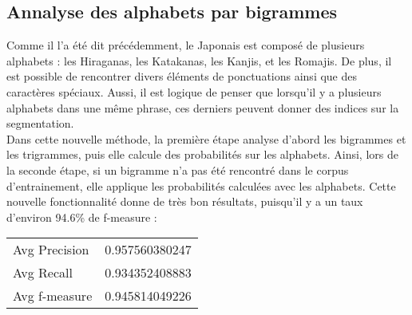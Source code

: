 
\subsection{Annalyse des alphabets par bigrammes}

Comme il l'a été dit précédemment, le Japonais est composé de plusieurs alphabets : les Hiraganas, les Katakanas, les Kanjis, et les Romajis. De plus, il est possible de rencontrer divers éléments de ponctuations ainsi que des caractères spéciaux. Aussi, il est logique de penser que lorsqu'il y a plusieurs alphabets dans une même phrase, ces derniers peuvent donner des indices sur la segmentation. \\

Dans cette nouvelle méthode, la première étape analyse d'abord les bigrammes et les trigrammes, puis elle calcule des probabilités sur les alphabets. Ainsi, lors de la seconde étape, si un bigramme n'a pas été rencontré dans le corpus d'entrainement, elle applique les probabilités calculées avec les alphabets. Cette nouvelle fonctionnalité donne de très bon résultats, puisqu'il y a un taux d'environ 94.6\% de f-measure :
\begin{center}
	\begin{tabular}{|l c|}
	  	\hline
	  	Avg Precision & 0.957560380247 \\
		Avg Recall & 0.934352408883 \\
		Avg f-measure & 0.945814049226 \\
	  	\hline
	\end{tabular}
\end{center}
	
	
